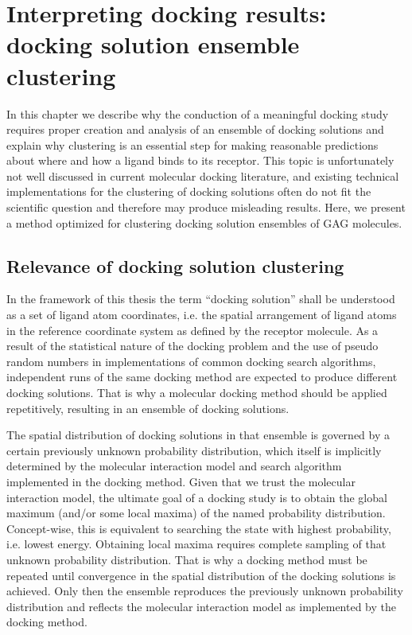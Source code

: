 \chapter{Interpreting docking results: docking solution ensemble clustering}

In this chapter we describe why the conduction of a meaningful docking study
requires proper creation and analysis of an ensemble of docking solutions and
explain why clustering is an essential step for making reasonable predictions
about where and how a ligand binds to its receptor. This topic is unfortunately
not well discussed in current molecular docking literature, and existing
technical implementations for the clustering of docking solutions often do not
fit the scientific question and therefore may produce misleading results. Here,
we present a method optimized for clustering docking solution ensembles of GAG
molecules.

\section{Relevance of docking solution clustering}
In the framework of this thesis the term \enquote{docking solution} shall be
understood as a set of ligand atom coordinates, i.e. the spatial arrangement of
ligand atoms in the reference coordinate system as defined by the receptor
molecule. As a result of the statistical nature of the docking problem and the
use of pseudo random numbers in implementations of common docking search
algorithms, independent runs of the same docking method are expected to produce
different docking solutions. That is why a molecular docking method should be
applied repetitively, resulting in an ensemble of docking solutions.

The spatial distribution of docking solutions in that ensemble is governed by a
certain previously unknown probability distribution, which itself is implicitly
determined by the molecular interaction model and search algorithm implemented
in the docking method. Given that we trust the molecular interaction model, the
ultimate goal of a docking study is to obtain the global maximum (and/or some
local maxima) of the named probability distribution. Concept-wise, this is
equivalent to searching the state with highest probability, i.e. lowest energy.
Obtaining local maxima requires complete sampling of that unknown probability
distribution. That is why a docking method must be repeated until convergence
in the spatial distribution of the docking solutions is achieved. Only then the
ensemble reproduces the previously unknown probability distribution and reflects
the molecular interaction model as implemented by the docking method.

